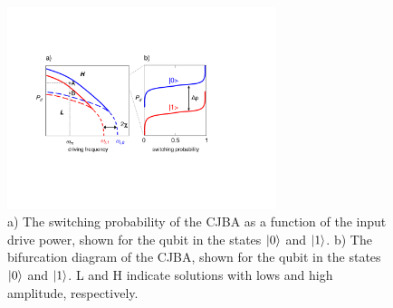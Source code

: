 \begin{figure}
	\includegraphics[width=0.7\textwidth]{./material/figures/2-qubit-processor/readout_principle}
	\caption[]{a) The switching probability of the CJBA as a function of the input drive power, shown for the qubit in the states $\left| 0 \right>$ and $\left| 1 \right>$. b) The bifurcation diagram of the CJBA, shown for the qubit in the states $\left| 0 \right>$ and $\left| 1 \right>$. L and H indicate solutions with lows and high amplitude, respectively.}
	\label{fig:readout_process_illustration}
\end{figure}

